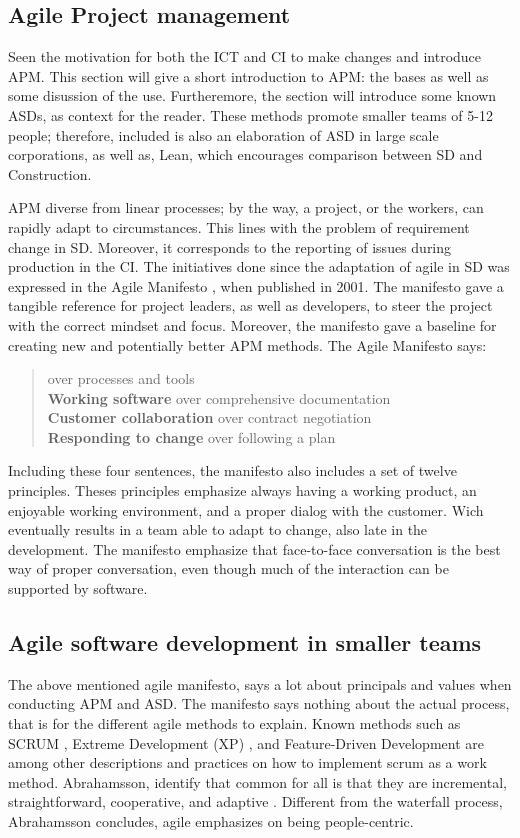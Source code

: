 \subsection{Agile Project management}
Seen the motivation for both the ICT and CI to make changes and introduce APM. This section will give a short introduction to APM: the bases as well as some disussion of the use. Furtheremore, the section will introduce some known ASDs, as context for the reader. These methods promote smaller teams of 5-12 people; therefore, included is also an elaboration of ASD in large scale corporations, as well as, Lean, which encourages comparison between SD and Construction. 

APM diverse from linear processes; by the way, a project, or the workers, can rapidly adapt to circumstances. This lines with the problem of requirement change in SD. Moreover, it corresponds to the reporting of issues during production in the CI. The initiatives done since the adaptation of agile in SD was expressed in the Agile Manifesto \cite{agile_manifesto}, when published in 2001. The manifesto gave a tangible reference for project leaders, as well as developers, to steer the project with the correct mindset and focus. Moreover, the manifesto gave a baseline for creating new and potentially better APM methods. The Agile Manifesto says:
\begin{quotation}
     over processes and tools \\
    {\bf Working software} over comprehensive documentation \\
    {\bf Customer collaboration} over contract negotiation \\
    {\bf Responding to change} over following a plan \\
\end{quotation}
Including these four sentences, the manifesto also includes a set of twelve principles. Theses principles emphasize always having a working product, an enjoyable working environment, and a proper dialog with the customer. Wich eventually results in a team able to adapt to change,  also late in the development. The manifesto emphasize that face-to-face conversation is the best way of proper conversation, even though much of the interaction can be supported by software.

\subsection{Agile software development in smaller teams}
The above mentioned agile manifesto, says a lot about principals and values when conducting APM and ASD. The manifesto says nothing about the actual process, that is for the different agile methods to explain. Known methods such as SCRUM \cite{sutherland}, Extreme Development (XP) \cite{Beck:1999:EPE:318762}, and Feature-Driven Development\cite{palmer2001practical} are among other descriptions and practices on how to implement scrum as a work method. Abrahamsson, identify that common for all is that they are incremental, straightforward, cooperative, and adaptive \cite{abrahamsson2017agile}. Different from the waterfall process, Abrahamsson concludes, agile emphasizes on being people-centric. 

